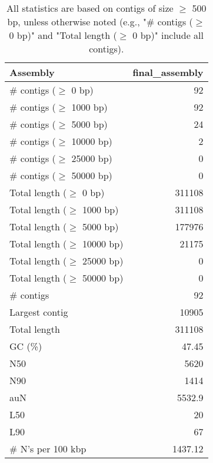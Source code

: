 \documentclass[12pt,a4paper]{article}
\begin{document}
\begin{table}[ht]
\begin{center}
\caption{All statistics are based on contigs of size $\geq$ 500 bp, unless otherwise noted (e.g., "\# contigs ($\geq$ 0 bp)" and "Total length ($\geq$ 0 bp)" include all contigs).}
\begin{tabular}{|l*{1}{|r}|}
\hline
Assembly & final\_assembly \\ \hline
\# contigs ($\geq$ 0 bp) & 92 \\ \hline
\# contigs ($\geq$ 1000 bp) & 92 \\ \hline
\# contigs ($\geq$ 5000 bp) & 24 \\ \hline
\# contigs ($\geq$ 10000 bp) & 2 \\ \hline
\# contigs ($\geq$ 25000 bp) & 0 \\ \hline
\# contigs ($\geq$ 50000 bp) & 0 \\ \hline
Total length ($\geq$ 0 bp) & 311108 \\ \hline
Total length ($\geq$ 1000 bp) & 311108 \\ \hline
Total length ($\geq$ 5000 bp) & 177976 \\ \hline
Total length ($\geq$ 10000 bp) & 21175 \\ \hline
Total length ($\geq$ 25000 bp) & 0 \\ \hline
Total length ($\geq$ 50000 bp) & 0 \\ \hline
\# contigs & 92 \\ \hline
Largest contig & 10905 \\ \hline
Total length & 311108 \\ \hline
GC (\%) & 47.45 \\ \hline
N50 & 5620 \\ \hline
N90 & 1414 \\ \hline
auN & 5532.9 \\ \hline
L50 & 20 \\ \hline
L90 & 67 \\ \hline
\# N's per 100 kbp & 1437.12 \\ \hline
\end{tabular}
\end{center}
\end{table}
\end{document}
